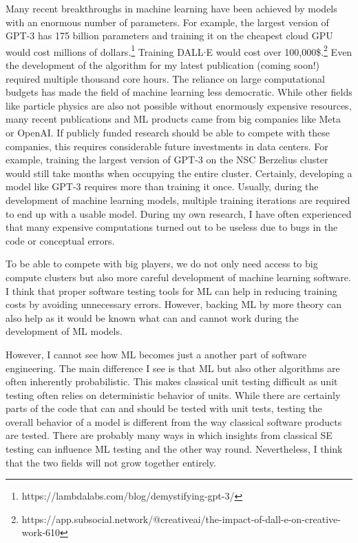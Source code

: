 \documentclass{article}
\begin{document}
    Many recent breakthroughs in machine learning have been achieved by models with an enormous number of parameters.
    For example, the largest version of GPT-3 has 175 billion parameters and training it on the cheapest cloud GPU would cost millions of dollars.\footnote{https://lambdalabs.com/blog/demystifying-gpt-3/}
    Training DALL$\cdot$E would cost over 100,000\$.\footnote{https://app.subsocial.network/@creativeai/the-impact-of-dall-e-on-creative-work-610}
    Even the development of the algorithm for my latest publication (coming soon!) required multiple thousand core hours.
    The reliance on large computational budgets has made the field of machine learning less democratic.
    While other fields like particle physics are also not possible without enormously expensive resources, many recent publications and ML products came from big companies like Meta or OpenAI.
    If publicly funded research should be able to compete with these companies, this requires considerable future investments in data centers.
    For example, training the largest version of GPT-3 on the NSC Berzelius cluster would still take months when occupying the entire cluster.
    Certainly, developing a model like GPT-3 requires more than training it once.
    Usually, during the development of machine learning models, multiple training iterations are required to end up with a usable model.
    During my own research, I have often experienced that many expensive computations turned out to be useless due to bugs in the code or conceptual errors.

    To be able to compete with big players, we do not only need access to big compute clusters but also more careful development of machine learning software.
    I think that proper software testing tools for ML can help in reducing training costs by avoiding unnecessary errors.
    However, backing ML by more theory can also help as it would be known what can and cannot work during the development of ML models.

    However, I cannot see how ML becomes just a another part of software engineering.
    The main difference I see is that ML but also other algorithms are often inherently probabilistic.
    This makes classical unit testing difficult as unit testing often relies on deterministic behavior of units.
    While there are certainly parts of the code that can and should be tested with unit tests, testing the overall behavior of a model is different from the way classical software products are tested.
    There are probably many ways in which insights from classical SE testing can influence ML testing and the other way round.
    Nevertheless, I think that the two fields will not grow together entirely.
\end{document}
